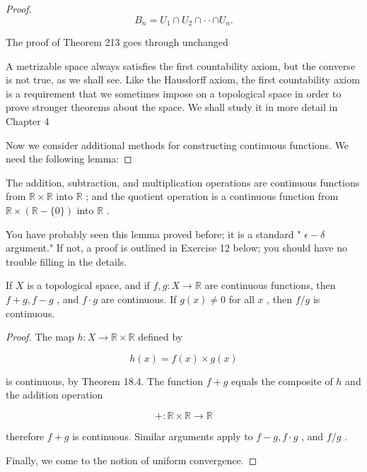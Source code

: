 \begin{proof}
\[
{B}_{n} = {U}_{1} \cap  {U}_{2} \cap   \cdot   \cdot   \cap  {U}_{n}.
\]

The proof of Theorem 213 goes through unchanged

A metrizable space always satisfies the first countability axiom, but the converse is not true, as we shall see. Like the Hausdorff axiom, the first countability axiom is a requirement that we sometimes impose on a topological space in order to prove stronger theorems about the space. We shall study it in more detail in Chapter 4

Now we consider additional methods for constructing continuous functions. We need the following lemma:
\end{proof}

\begin{lemma} The addition, subtraction, and multiplication operations are continuous functions from \(\mathbb{R} \times  \mathbb{R}\) into \(\mathbb{R}\) ; and the quotient operation is a continuous function from \(\mathbb{R} \times  \left( {\mathbb{R}-\{ 0\} }\right)\) into \(\mathbb{R}\) .
\end{lemma}

You have probably seen this lemma proved before; it is a standard " \(\epsilon  - \delta\) argument." If not, a proof is outlined in Exercise 12 below; you should have no trouble filling in the details.

\begin{theorem} If \(X\) is a topological space, and if \(f,g : X \rightarrow  \mathbb{R}\) are continuous functions, then \(f + g,f - g\) , and \(f \cdot  g\) are continuous. If \(g\left( x\right)  \neq  0\) for all \(x\) , then \(f/g\) is continuous.

\end{theorem}
\begin{proof}
The map \(h : X \rightarrow  \mathbb{R} \times  \mathbb{R}\) defined by

\[
h\left( x\right)  = f\left( x\right)  \times  g\left( x\right)
\]

is continuous, by Theorem 18.4. The function \(f + g\) equals the composite of \(h\) and the addition operation

\[
+  : \mathbb{R} \times  \mathbb{R} \rightarrow  \mathbb{R}
\]

therefore \(f + g\) is continuous. Similar arguments apply to \(f - g,f \cdot  g\) , and \(f/g\) .

Finally, we come to the notion of uniform convergence.
\end{proof}

